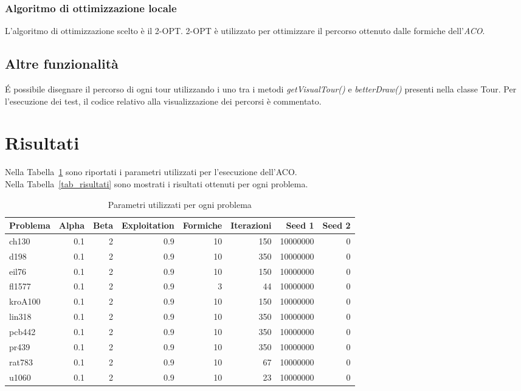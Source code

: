 \documentclass[a4paper,11pt,oneside]{DTI}
\begin{document}
\subsection*{Algoritmo di ottimizzazione locale}
\label{sec_ottimizzazione}
L'algoritmo di ottimizzazione scelto è il 2-OPT. 2-OPT è utilizzato per ottimizzare il percorso ottenuto dalle formiche dell'\textit{ACO}.


\section*{Altre funzionalità}
\'E possibile disegnare il percorso di ogni tour utilizzando i uno tra i metodi \textit{getVisualTour()} e \textit{betterDraw()} presenti nella classe Tour. Per l'esecuzione dei test, il codice relativo alla visualizzazione dei percorsi è commentato.


\chapter*{Risultati}
\label{cha_risultati}

Nella Tabella~\ref{tab_parametri} sono riportati i parametri utilizzati per l'esecuzione dell'ACO.\\
Nella Tabella~\ref{tab_risultati} sono mostrati i risultati ottenuti per ogni problema.\\

\begin{table}[htb]
  \caption{Parametri utilizzati per ogni problema}
  \label{tab_parametri}
  \centering
\begin{tabular}{lrrrrrrr}
  \toprule
  Problema		&	Alpha		&	Beta	&	Exploitation &	Formiche &  Iterazioni  &	Seed 1		&	Seed 2\\
  \midrule
  ch130			&	0.1			&	2		&	0.9	  & 10 & 150	&   10000000	&	0\\
  d198			&	0.1			&	2		&	0.9   & 10 & 350 &	10000000	&	0	\\
  eil76			&	0.1		    &	2		&	0.9   & 10 & 150 &	10000000	&	0	\\
  fl1577		&	0.1			&	2		&	0.9   & 3  & 44	&	10000000	&	0	\\
  kroA100		&	0.1			&	2		&	0.9   & 10 & 150	&   10000000	&	0	\\
  lin318		&	0.1			&	2		&	0.9   & 10 & 350	&	10000000	&	0	\\
  pcb442		&	0.1			&	2		&	0.9   & 10 & 350	&	10000000	&	0	\\
  pr439			&	0.1			&	2		&	0.9   & 10 & 350	&	10000000	&	0	\\
  rat783		&	0.1			&	2		&	0.9   & 10 & 67	&	10000000	&	0	\\
  u1060			&	0.1			&	2		&	0.9   & 10 & 23	&	10000000	&	0	\\
  \midrule
\end{tabular}
\end{table}
\end{document}
